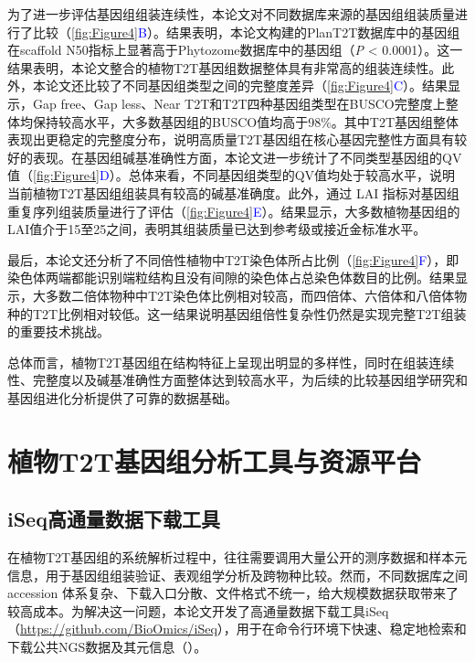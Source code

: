 为了进一步评估基因组组装连续性，本论文对不同数据库来源的基因组组装质量进行了比较（\textcolor{blue}{\autoref{fig:Figure4}B}）。结果表明，本论文构建的PlanT2T数据库中的基因组在scaffold N50指标上显著高于Phytozome数据库中的基因组（\textit{P} < 0.0001）。这一结果表明，本论文整合的植物T2T基因组数据整体具有非常高的组装连续性。此外，本论文还比较了不同基因组类型之间的完整度差异（\textcolor{blue}{\autoref{fig:Figure4}C}）。结果显示，Gap free、Gap less、Near T2T和T2T四种基因组类型在BUSCO完整度上整体均保持较高水平，大多数基因组的BUSCO值均高于98\%。其中T2T基因组整体表现出更稳定的完整度分布，说明高质量T2T基因组在核心基因完整性方面具有较好的表现。在基因组碱基准确性方面，本论文进一步统计了不同类型基因组的QV值（\textcolor{blue}{\autoref{fig:Figure4}D}）。总体来看，不同基因组类型的QV值均处于较高水平，说明当前植物T2T基因组组装具有较高的碱基准确度。此外，通过 LAI 指标对基因组重复序列组装质量进行了评估（\textcolor{blue}{\autoref{fig:Figure4}E}）。结果显示，大多数植物基因组的LAI值介于15至25之间，表明其组装质量已达到参考级或接近金标准水平\cite{ou2018assessing}。

最后，本论文还分析了不同倍性植物中T2T染色体所占比例（\textcolor{blue}{\autoref{fig:Figure4}F}），即染色体两端都能识别端粒结构且没有间隙的染色体占总染色体数目的比例。结果显示，大多数二倍体物种中T2T染色体比例相对较高，而四倍体、六倍体和八倍体物种的T2T比例相对较低。这一结果说明基因组倍性复杂性仍然是实现完整T2T组装的重要技术挑战。

总体而言，植物T2T基因组在结构特征上呈现出明显的多样性，同时在组装连续性、完整度以及碱基准确性方面整体达到较高水平，为后续的比较基因组学研究和基因组进化分析提供了可靠的数据基础。

\section{植物T2T基因组分析工具与资源平台}

\subsection{iSeq高通量数据下载工具}

在植物T2T基因组的系统解析过程中，往往需要调用大量公开的测序数据和样本元信息，用于基因组组装验证、表观组学分析及跨物种比较。然而，不同数据库之间 accession 体系复杂、下载入口分散、文件格式不统一，给大规模数据获取带来了较高成本。为解决这一问题，本论文开发了高通量数据下载工具iSeq（\url{https://github.com/BioOmics/iSeq}），用于在命令行环境下快速、稳定地检索和下载公共NGS数据及其元信息（）。

